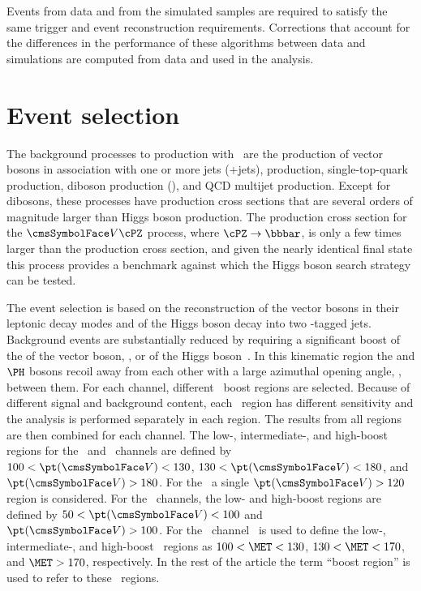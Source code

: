 \documentclass[12pt,twoside,a4paper,cmspaper,final,collab]{cms-tdr}
\begin{document}
Events from data and from the simulated samples are required to
satisfy the same trigger and event reconstruction requirements. Corrections
that account for the differences in the performance of these
algorithms between data and simulations are computed from data and used in
the analysis.


\section{Event selection}\label{sec:hbb_Event_Selection}


The background processes to \VH production with \HBB\ are the production of vector
bosons in association with one or more jets ({\Vvar}+jets), \ttbar production,
single-top-quark production, diboson production ({\Vvar}{\Vvar}),
and QCD multijet production. Except for dibosons, these processes have
production cross sections that are several orders of magnitude larger
than Higgs boson production. The production cross section for the ${\Vvar}\cPZ$ process, where
$\cPZ\to\bbbar$, is only a few times larger than the \VH
production cross section, and given the nearly identical final state this process provides a
benchmark against which the Higgs boson search strategy can be tested.



The event selection is based on the
reconstruction of the vector bosons in their leptonic decay modes and of the Higgs boson decay
into two \cPqb-tagged jets. Background events are substantially reduced by
requiring a significant boost of the \pt of the vector boson, \ptV, or
of the
Higgs boson~\cite{PhysRevLett.100.242001}.
In this kinematic region the \Vvar and $\PH$ bosons recoil away  from each other with a large azimuthal opening angle,  \dphiVH,
between them.  For each channel, different
\ptV\ boost regions are selected.
Because of different signal and background
content, each \ptV\ region has different sensitivity and
the analysis is performed separately in each region. The
results from all regions are then combined for each channel. The
{low-,} \mbox{intermediate-}, and high-boost regions
for the \WmnH\ and \WenH\ channels are defined by $100<\ptV<130$\GeV,  $130<\ptV<180$\GeV, and
$\ptV>180$\GeV.
For the \WtnH\ a single $\ptV>120$\GeV region is considered.
For the \ZllH\ channels, the low- and high-boost
regions are defined by $50<\ptV<100$\GeV
and $\ptV>100$\GeV.
For the \ZnnH\ channel \MET\ is used to define the low-, intermediate-, and high-boost
\ptV\ regions as $100<\MET<130$\GeV, $130<\MET<170$\GeV, and
$\MET>170$\GeV, respectively. In the rest of the article
the term ``boost region'' is used to refer to these \ptV\ regions.
\end{document}
